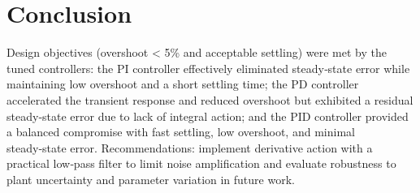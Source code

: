 \documentclass[12pt]{article}
\begin{document}
\section*{Conclusion}
Design objectives (overshoot < 5\% and acceptable settling) were met by the tuned controllers: the PI controller effectively eliminated steady‑state error while maintaining low overshoot and a short settling time; the PD controller accelerated the transient response and reduced overshoot but exhibited a residual steady‑state error due to lack of integral action; and the PID controller provided a balanced compromise with fast settling, low overshoot, and minimal steady‑state error. Recommendations: implement derivative action with a practical low‑pass filter to limit noise amplification and evaluate robustness to plant uncertainty and parameter variation in future work.



\renewcommand{\bibname}{References}

\end{document}
